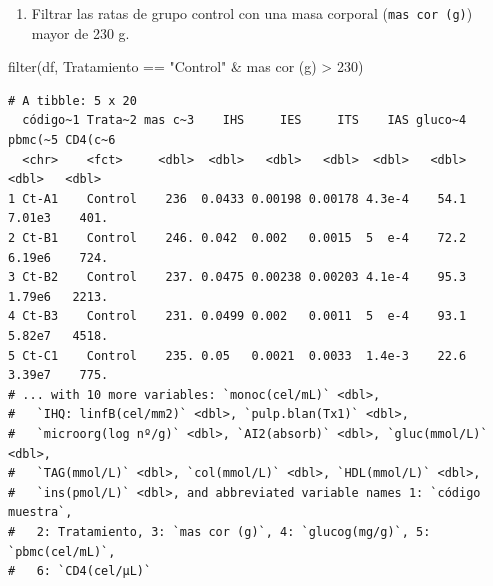 \documentclass[
  a4paper,
]{scrreport}
\newenvironment{Shaded}{\begin{snugshade}}{\end{snugshade}}
\newcommand{\AttributeTok}[1]{\textcolor[rgb]{0.40,0.45,0.13}{#1}}
\newcommand{\DecValTok}[1]{\textcolor[rgb]{0.68,0.00,0.00}{#1}}
\newcommand{\FunctionTok}[1]{\textcolor[rgb]{0.28,0.35,0.67}{#1}}
\newcommand{\NormalTok}[1]{\textcolor[rgb]{0.00,0.23,0.31}{#1}}
\newcommand{\SpecialCharTok}[1]{\textcolor[rgb]{0.37,0.37,0.37}{#1}}
\newcommand{\StringTok}[1]{\textcolor[rgb]{0.13,0.47,0.30}{#1}}
\providecommand{\tightlist}{%
  \setlength{\itemsep}{0pt}\setlength{\parskip}{0pt}}\usepackage{longtable,booktabs,array}
\theoremstyle{definition}
\theoremstyle{definition}
\theoremstyle{remark}
\begin{document}
\begin{enumerate}
\def\labelenumi{\alph{enumi}.}
\setcounter{enumi}{3}
\tightlist
\item
  Filtrar las ratas de grupo control con una masa corporal
  (\texttt{mas\ cor\ (g)}) mayor de 230 g.
\end{enumerate}

\begin{tcolorbox}[enhanced jigsaw, colbacktitle=quarto-callout-note-color!10!white, breakable, opacitybacktitle=0.6, left=2mm, opacityback=0, leftrule=.75mm, colframe=quarto-callout-note-color-frame, bottomrule=.15mm, toprule=.15mm, toptitle=1mm, colback=white, titlerule=0mm, title=\textcolor{quarto-callout-note-color}{\faInfo}\hspace{0.5em}{Solución}, rightrule=.15mm, arc=.35mm, bottomtitle=1mm, coltitle=black]

\begin{Shaded}
\begin{Highlighting}[]
\FunctionTok{filter}\NormalTok{(df, Tratamiento }\SpecialCharTok{==} \StringTok{"Control"} \SpecialCharTok{\&} \StringTok{\textasciigrave{}}\AttributeTok{mas cor (g)}\StringTok{\textasciigrave{}} \SpecialCharTok{\textgreater{}} \DecValTok{230}\NormalTok{)}
\end{Highlighting}
\end{Shaded}

\begin{verbatim}
# A tibble: 5 x 20
  código~1 Trata~2 mas c~3    IHS     IES     ITS    IAS gluco~4 pbmc(~5 CD4(c~6
  <chr>    <fct>     <dbl>  <dbl>   <dbl>   <dbl>  <dbl>   <dbl>   <dbl>   <dbl>
1 Ct-A1    Control    236  0.0433 0.00198 0.00178 4.3e-4    54.1  7.01e3    401.
2 Ct-B1    Control    246. 0.042  0.002   0.0015  5  e-4    72.2  6.19e6    724.
3 Ct-B2    Control    237. 0.0475 0.00238 0.00203 4.1e-4    95.3  1.79e6   2213.
4 Ct-B3    Control    231. 0.0499 0.002   0.0011  5  e-4    93.1  5.82e7   4518.
5 Ct-C1    Control    235. 0.05   0.0021  0.0033  1.4e-3    22.6  3.39e7    775.
# ... with 10 more variables: `monoc(cel/mL)` <dbl>,
#   `IHQ: linfB(cel/mm2)` <dbl>, `pulp.blan(Tx1)` <dbl>,
#   `microorg(log nº/g)` <dbl>, `AI2(absorb)` <dbl>, `gluc(mmol/L)` <dbl>,
#   `TAG(mmol/L)` <dbl>, `col(mmol/L)` <dbl>, `HDL(mmol/L)` <dbl>,
#   `ins(pmol/L)` <dbl>, and abbreviated variable names 1: `código muestra`,
#   2: Tratamiento, 3: `mas cor (g)`, 4: `glucog(mg/g)`, 5: `pbmc(cel/mL)`,
#   6: `CD4(cel/µL)`
\end{verbatim}

\end{tcolorbox}
\end{document}
